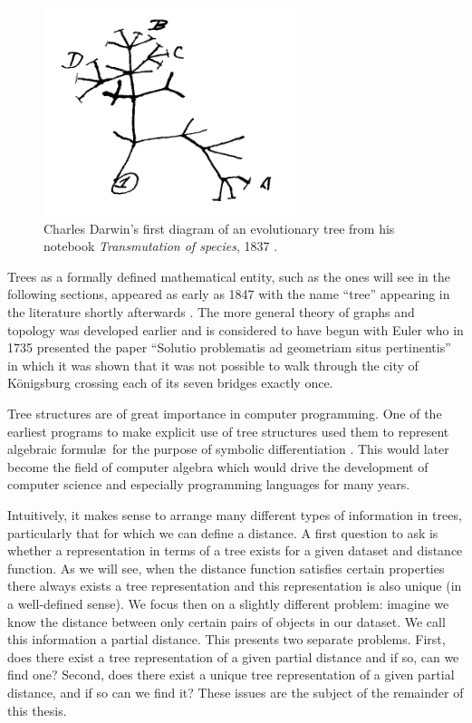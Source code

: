 \begin{figure}
  \centering
  \includegraphics[width=20em]{figures/background2/darwin-tree.png}
  \caption{Charles Darwin's first diagram of an evolutionary tree from his
    notebook \textit{Transmutation of species}, 1837 \cite{darwin1837notebook}.}
  \label{fig:darwin-tree}
\end{figure}

Trees as a formally defined mathematical entity, such as the ones will see in
the following sections, appeared as early as 1847 with the name ``tree''
appearing in the literature shortly afterwards \cite{knuth97taocp1}.  The more
general theory of graphs and topology was developed earlier and is considered
to have begun with Euler who in 1735 presented the paper ``Solutio problematis
ad geometriam situs pertinentis'' \cite{euler1735solutio} in which it was
shown that it was not possible to walk through the city of Königsburg crossing
each of its seven bridges exactly once.

Tree structures are of great importance in computer programming.  One of the
earliest programs to make explicit use of tree structures used them to
represent algebraic formul\ae\ for the purpose of symbolic differentiation
\cite{knuth97taocp1,kahrimanian53differentiation}.  This would later become
the field of computer algebra which would drive the development of computer
science and especially programming languages for many years.

Intuitively, it makes sense to arrange many different types of information in
trees, particularly that for which we can define a distance.  A first question
to ask is whether a representation in terms of a tree exists for a given
dataset and distance function.  As we will see, when the distance function
satisfies certain properties there always exists a tree representation and
this representation is also unique (in a well-defined sense).  We focus then
on a slightly different problem: imagine we know the distance between only
certain pairs of objects in our dataset.  We call this information a partial
distance.  This presents two separate problems.  First, does there exist a
tree representation of a given partial distance and if so, can we find one?
Second, does there exist a unique tree representation of a given partial
distance, and if so can we find it?  These issues are the subject of the
remainder of this thesis.

